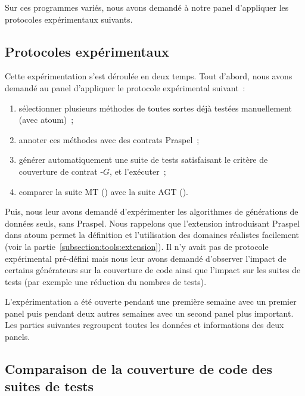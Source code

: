 Sur ces programmes variés, nous avons demandé à notre panel d'appliquer les
protocoles expérimentaux suivants.

\subsection{Protocoles expérimentaux}

Cette expérimentation s'est déroulée en deux temps. Tout d'abord, nous avons
demandé au panel d'appliquer le protocole expérimental suivant~:
%
\begin{enumerate}

\item sélectionner plusieurs méthodes de toutes sortes déjà testées
manuellement (avec atoum)~;

\item annoter ces méthodes avec des contrats Praspel~;

\item générer automatiquement une suite de tests satisfaisant le critère de
couverture de contrat -$G$, et l'exécuter~;

\item comparer la suite MT () avec la suite AGT
().

\end{enumerate}

Puis, nous leur avons demandé d'expérimenter les algorithmes de générations de
données seuls, sans Praspel. Nous rappelons que l'extension introduisant Praspel
dans atoum permet la définition et l'utilisation des domaines réalistes
facilement (voir la partie~\ref{subsection:tools:extension}). Il n'y avait pas
de protocole expérimental pré-défini mais nous leur avons demandé d'observer
l'impact de certains générateurs sur la couverture de code ainsi que l'impact
sur les suites de tests (par exemple une réduction du nombres de tests).

L'expérimentation a été ouverte pendant une première semaine avec un premier
panel puis pendant deux autres semaines avec un second panel plus important. Les
parties suivantes regroupent toutes les données et informations des deux panels.


\subsection{Comparaison de la couverture de code des suites de tests}

